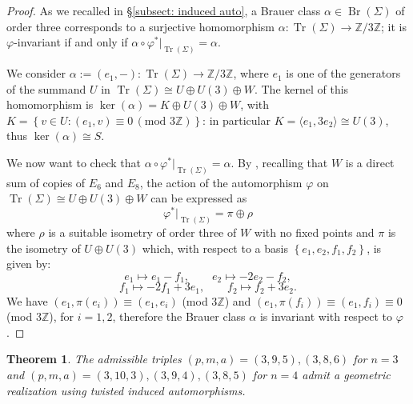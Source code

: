 \documentclass{amsart}
\newtheorem{theorem}{Theorem}[section]
\theoremstyle{definition}
\newcommand{\ra}{\rightarrow}
\newcommand{\IZ}{\mathbb{Z}}
\newcommand{\coloneqq}{:=}
\DeclareMathOperator{\br}{Br}
\DeclareMathOperator{\trans}{Tr}
\begin{document}
\begin{proof}
As we recalled in \S \ref{subsect: induced auto}, a Brauer class $\alpha \in \br(\Sigma)$ of order three corresponds to a surjective homomorphism $\alpha: \trans(\Sigma) \ra \IZ/3 \IZ$; it is $\varphi$-invariant if and only if $\alpha \circ \varphi^*\vert_{\trans(\Sigma)} = \alpha$.

We consider $\alpha \coloneqq (e_1, -): \trans(\Sigma) \ra \IZ/3\IZ$, where $e_1$ is one of the generators of the summand $U$ in $\trans(\Sigma) \cong U \oplus U(3) \oplus W$. The kernel of this homomorphism is $\ker(\alpha) = K \oplus U(3) \oplus W$, with $K = \left\{ v \in U : (e_1, v) \equiv 0 \, (\text{mod } 3\IZ) \right\}$: in particular $K = \langle e_1, 3e_2 \rangle \cong U(3)$, thus $\ker(\alpha) \cong S$.

We now want to check that $\alpha \circ \varphi^*\vert_{\trans(\Sigma)} = \alpha$. By \cite[Examples 1.1]{autom_k3_ord3}, recalling that $W$ is a direct sum of copies of $E_6$ and $E_8$, the action of the automorphism $\varphi$ on $\trans(\Sigma) \cong U \oplus U(3) \oplus W$ can be expressed as
\[ \varphi^*\vert_{\trans(\Sigma)} = \pi \oplus \rho\]
\noindent where $\rho$ is a suitable isometry of order three of $W$ with no fixed points and $\pi$ is the isometry of $U \oplus U(3)$ which, with respect to a basis $\left\{ e_1, e_2, f_1, f_2 \right\}$, is given by:
\[ e_1 \mapsto e_1 - f_1, \qquad e_2 \mapsto -2e_2 - f_2,\]
\[f_1 \mapsto -2f_1 + 3e_1, \qquad f_2 \mapsto f_2 + 3 e_2.\]
We have $(e_1, \pi(e_i)) \equiv (e_1,  e_i)$ (mod $3 \IZ$) and $(e_1, \pi(f_i)) \equiv (e_1, f_i) \equiv 0$ (mod $3 \IZ$), for $i=1,2$, therefore the Brauer class $\alpha$ is invariant with respect to $\varphi$.
\end{proof}

\begin{theorem} \label{thm: twisted induced realizations}
The admissible triples $(p,m,a) = (3,9,5), (3,8,6)$ for $n=3$ and $(p,m,a) = (3,10,3), (3,9,4), (3,8,5)$ for $n=4$ admit a geometric realization using twisted induced automorphisms. 
\end{theorem}
\end{document}
